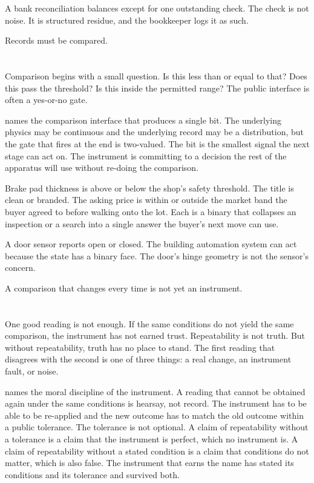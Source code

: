 A bank reconciliation balances except for one outstanding check. The check
is not noise. It is structured residue, and the bookkeeper logs it as such.

Records must be compared.

\section{}
\label{se:binary}

Comparison begins with a small question. Is this less than or equal to
that? Does this pass the threshold? Is this inside the permitted range?
The public interface is often a yes-or-no gate.

 names the comparison interface that produces a single bit.
The underlying physics may be continuous and the underlying record may be a
distribution, but the gate that fires at the end is two-valued. The bit is
the smallest signal the next stage can act on. The instrument is committing
to a decision the rest of the apparatus will use without re-doing the
comparison.

Brake pad thickness is above or below the shop's safety threshold. The
title is clean or branded. The asking price is within or outside the market
band the buyer agreed to before walking onto the lot. Each is a binary
that collapses an inspection or a search into a single answer the buyer's
next move can use.

A door sensor reports open or closed. The building automation system can
act because the state has a binary face. The door's hinge geometry is not
the sensor's concern.

A comparison that changes every time is not yet an instrument.

\section{}
\label{se:repeatable}

One good reading is not enough. If the same conditions do not yield the
same comparison, the instrument has not earned trust. Repeatability is not
truth. But without repeatability, truth has no place to stand. The first
reading that disagrees with the second is one of three things: a real
change, an instrument fault, or noise.

 names the moral discipline of the instrument. A reading
that cannot be obtained again under the same conditions is hearsay, not
record. The instrument has to be able to be re-applied and the new outcome
has to match the old outcome within a public tolerance. The tolerance is
not optional. A claim of repeatability without a tolerance is a claim that
the instrument is perfect, which no instrument is. A claim of repeatability
without a stated condition is a claim that conditions do not matter, which
is also false. The instrument that earns the name has stated its conditions
and its tolerance and survived both.

